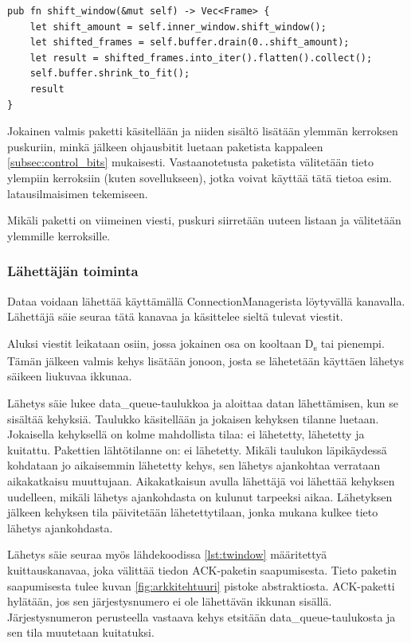 \documentclass[a4paper,12pt]{article}
\begin{document}
    \begin{lstlisting}[caption={Datan purkaminen puskurista}, label={lst:shift_rwindow}]
pub fn shift_window(&mut self) -> Vec<Frame> {
    let shift_amount = self.inner_window.shift_window();
    let shifted_frames = self.buffer.drain(0..shift_amount);
    let result = shifted_frames.into_iter().flatten().collect();
    self.buffer.shrink_to_fit();
    result
}\end{lstlisting}

    Jokainen valmis paketti käsitellään ja niiden sisältö lisätään ylemmän kerroksen puskuriin, minkä jälkeen ohjausbitit luetaan paketista kappaleen \ref{subsec:control_bits} mukaisesti. Vastaanotetusta paketista välitetään tieto ylempiin kerroksiin (kuten sovellukseen), jotka voivat käyttää tätä tietoa esim. latausilmaisimen tekemiseen. \par

    Mikäli paketti on viimeinen viesti, puskuri siirretään uuteen listaan ja välitetään ylemmille kerroksille.

    \subsubsection*{Lähettäjän toiminta}\label{subsec:sender_impl}
    Dataa voidaan lähettää käyttämällä ConnectionManagerista löytyvällä kanavalla. Lähettäjä säie seuraa tätä kanavaa ja käsittelee sieltä tulevat viestit. \par

    Aluksi viestit leikataan osiin, jossa jokainen osa on kooltaan D\textsubscript{s} tai pienempi. Tämän jälkeen valmis kehys lisätään jonoon, josta se lähetetään käyttäen lähetys säikeen liukuvaa ikkunaa.
 
Lähetys säie lukee data\_queue-taulukkoa ja aloittaa datan lähettämisen, kun se sisältää kehyksiä. Taulukko käsitellään ja jokaisen kehyksen tilanne luetaan. Jokaisella kehyksellä on kolme mahdollista tilaa: ei lähetetty, lähetetty ja kuitattu. Pakettien lähtötilanne on: ei lähetetty. Mikäli taulukon läpikäydessä kohdataan jo aikaisemmin lähetetty kehys, sen lähetys ajankohtaa verrataan aikakatkaisu muuttujaan. Aikakatkaisun avulla lähettäjä voi lähettää kehyksen uudelleen, mikäli lähetys ajankohdasta on kulunut tarpeeksi aikaa. Lähetyksen jälkeen kehyksen tila päivitetään lähetettytilaan, jonka mukana kulkee tieto lähetys ajankohdasta. \par

Lähetys säie seuraa myös lähdekoodissa \ref{lst:twindow} määritettyä kuittauskanavaa, joka välittää tiedon ACK-paketin saapumisesta. Tieto paketin saapumisesta tulee kuvan \ref{fig:arkkitehtuuri} pistoke abstraktiosta. ACK-paketti hylätään, jos sen järjestysnumero ei ole lähettävän ikkunan sisällä. Järjestysnumeron perusteella vastaava kehys etsitään data\_queue-taulukosta ja sen tila muutetaan kuitatuksi. \par
    
\end{document}
